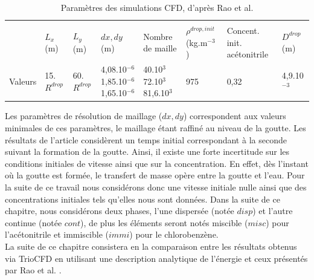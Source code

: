 \begin{table}[H]
	\centering  %
	\begin{tabularx}{\textwidth}{@{}lYYYYYYY@{}}
		\toprule
		&\\
		& $L_x$ (m)
		& $L_y$ (m)
		& $dx, dy$ (m)
		& Nombre de maille
		& $\rho^{drop,init}$ (kg.m$^{-3}$)
		& Concent. init. acétonitrile
		& $D^{drop}$  (m)\\
		\midrule
		 Valeurs & 15.$R^{drop}$ & 60.$R^{drop}$ & 4,08.10$^{-6}$ 1,85.10$^{-6}$ 1,65.10$^{-6}$ & 40.10$^{3}$  \hspace{2cm}  72.10$^{3}$  \hspace{2cm} 81,6.10$^{3}$ & 975 & 0,32& 4,9.10$^{-3}$ \\
		\bottomrule
	\end{tabularx}
	\caption{Paramètres des simulations CFD, d'après Rao et al.\cite{rao_influence_2015}} \label{table:rao_al}
\end{table}
Les paramètres de résolution de maillage ($dx,dy$) correspondent aux valeurs minimales de ces paramètres, le maillage étant raffiné au niveau de la goutte. Les résultats de l'article considèrent un temps initial correspondant à la seconde suivant la formation de la goutte. Ainsi, il existe une forte incertitude sur les conditions initiales de vitesse ainsi que sur la concentration. En effet, dès l'instant où la goutte est formée, le transfert de masse opère entre la goutte et l'eau. Pour la suite de ce travail nous considérons donc une vitesse initiale nulle ainsi que des concentrations initiales tels qu'elles nous sont données. Dans la suite de ce chapitre, nous considérons deux phases, l'une dispersée (notée $disp$) et l'autre continue (notée $cont$), de plus les éléments seront notés miscible ($misc$) pour l'acétonitrile et immiscible ($immi$) pour le chlorobenzène.\\
La suite de ce chapitre consistera en la comparaison entre les résultats obtenus via TrioCFD en utilisant une description analytique de l'énergie et ceux présentés par Rao et al. \cite{rao_influence_2015}.
